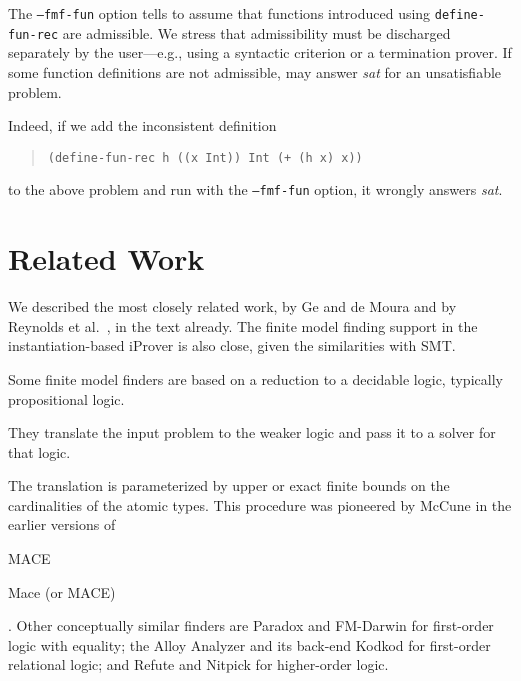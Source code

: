 The \texttt{--fmf-fun} option tells \cvc to assume that
functions introduced using \texttt{define-\allowbreak fun-\allowbreak rec} are admissible.
We stress that admissibility must be discharged separately by the user---e.g., using a
syntactic criterion or a termination prover.
If some function definitions are not admissible, \cvc may answer \emph{sat} for
an unsatisfiable problem. 
\begin{longv}
Indeed, if we add the inconsistent definition
%
\begin{quote}
\begin{verbatim}
(define-fun-rec h ((x Int)) Int (+ (h x) x))
\end{verbatim}
\end{quote}
%
to the above problem and run \cvc with the \texttt{--fmf-fun} option,
it wrongly answers \emph{sat}.
\end{longv}


\section{Related Work}

We described the most closely related work, by Ge and de Moura
\cite{GeDeM-CAV-09} and by Reynolds et al.\
\cite{ReyEtAl-1-RR-13,reynolds-et-al-2013}, in the text already.
The finite model finding support in the instantiation-based iProver
\cite{korovin-2013} is also close, given the similarities with SMT.


Some finite model finders are based on a reduction to a decidable logic,
typically propositional logic. \begin{longv}They translate the input problem to the weaker
logic and pass it to a solver for that logic.\end{longv}
The translation is parameterized by upper or exact finite bounds on
the cardinalities of the atomic types. This procedure was pioneered by McCune
in the earlier versions of
\begin{shortv}MACE\end{shortv}\begin{longv}Mace (or MACE)\end{longv}
\cite{mccune-1994}.
Other conceptually similar finders are Paradox \cite{claessen-sorensson-2003}
and FM-Darwin \cite{baumgartner-et-al-2009} for first-order logic with
equality; the Alloy Analyzer and its back-end Kodkod \cite{torlak-jackson-2007}
for first-order relational logic; and Refute \cite{weber-2008} and Nitpick
\cite{blanchette-nipkow-2010} for higher-order logic.

